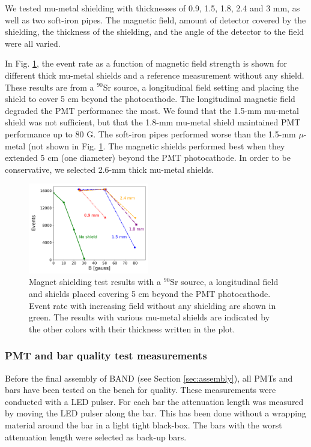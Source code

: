 \documentclass[3p,final,twocolumn]{elsarticle}
\begin{document}
  We tested mu-metal shielding with  thicknesses of 0.9, 1.5, 1.8,
  2.4 and 3 \si{\milli\meter}, as well as two soft-iron pipes. The magnetic field, amount of detector covered by the
  shielding, the thickness of the shielding, and the angle of the detector to the field were
  all varied.
  
In Fig. \ref{fig:shielding_results}, the event rate as a function of magnetic field strength is shown for different thick mu-metal shields and a reference measurement without any shield. These results are from a $^{90}$Sr source, a longitudinal field setting and placing the shield to cover 5 \si{\centi\meter} beyond the photocathode. 
The longitudinal magnetic field degraded the PMT performance
the most.  We found that the 1.5-\si{\milli\meter} mu-metal shield was not
sufficient, but that the 1.8-\si{\milli\meter} mu-metal shield maintained PMT
performance up to 80 G.  The soft-iron pipes performed worse than the
1.5-\si{\milli\meter} $\mu$-metal (not shown in Fig. \ref{fig:shielding_results}. The magnetic shields performed best when they
extended 5 \si{\centi\meter} (one diameter) beyond the PMT photocathode.  In order to
be conservative, we selected 2.6-mm thick mu-metal shields.

\begin{figure}[tb]
	\centering
			\includegraphics[width=0.47\textwidth]{shielding_results.pdf}
	\caption{Magnet shielding test results with a $^{90}$Sr source, a longitudinal field and shields placed covering 5 \si{\centi\meter} beyond the PMT photocathode. Event rate with increasing field without any shielding are shown in green. The results with various mu-metal shields are indicated by the other colors with their thickness written in the plot. }
	\label{fig:shielding_results}
\end{figure}


\subsubsection{PMT and bar quality test measurements}
Before the final assembly of BAND (see Section \ref{sec:assembly}), all PMTs and bars have been tested on the bench for quality. These measurements were conducted with a LED pulser.
For each bar the attenuation length was measured by moving the LED pulser along the bar. This has been done without a wrapping material around the bar in a light tight black-box. The bars with the worst attenuation length were selected as back-up bars.
\end{document}
